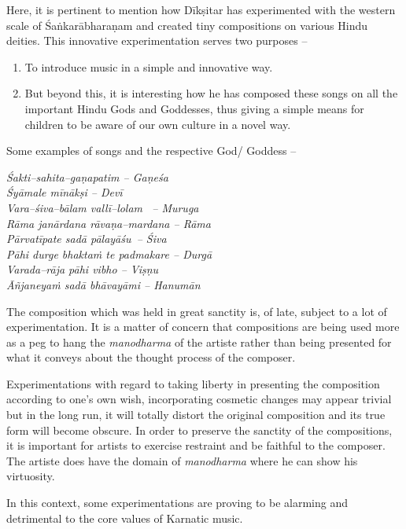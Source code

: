 Here, it is pertinent to mention how Dīkṣitar has experimented with the western scale of Śaṅkarābharaṇam and created tiny compositions on various Hindu deities. This innovative experimentation serves two purposes –

\begin{enumerate}
\item To introduce music in a simple and innovative way.

 \item But beyond this, it is interesting how he has composed these songs on all the important Hindu Gods and Goddesses, thus giving a simple means for children to be aware of our own culture in a novel way.

\end{enumerate}

Some examples of songs and the respective God/ Goddess –

\textit{Śakti–sahita–gaṇapatim – Gaṇeśa} \\\textit{Śyāmale mīnākṣi – Devī}\\\textit{Vara–śiva–bālam vallī–lolam  – Muruga}\\\textit{Rāma janārdana rāvaṇa–mardana – Rāma} \\\textit{Pārvatīpate sadā pālayāśu – Śiva}\\\textit{Pāhi durge bhaktaṁ te padmakare – Durgā} \\\textit{Varada–rāja pāhi vibho – Viṣṇu}\\\textit{Āñjaneyaṁ sadā bhāvayāmi – Hanumān}

The composition which was held in great sanctity is, of late, subject to a lot of experimentation. It is a matter of concern that compositions are being used more as a peg to hang the \textit{manodharma} of the artiste rather than being presented for what it conveys about the thought process of the composer.

Experimentations with regard to taking liberty in presenting the composition according to one’s own wish, incorporating cosmetic changes may appear trivial but in the long run, it will totally distort the original composition and its true form will become obscure. In order to preserve the sanctity of the compositions, it is important for artists to exercise restraint and be faithful to the composer. The artiste does have the domain of \textit{manodharma} where he can show his virtuosity.

In this context, some experimentations are proving to be alarming and detrimental to the core values of Karnatic music.

